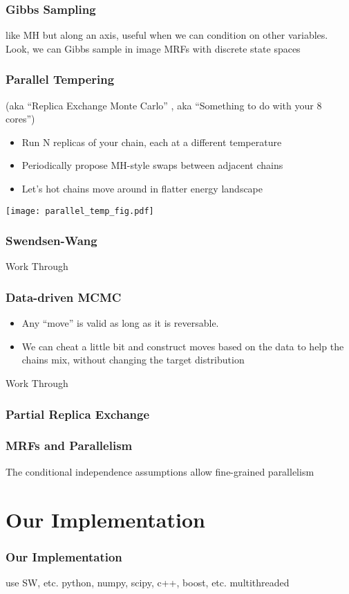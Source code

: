 \documentclass{beamer}
\begin{document}
\begin{frame}
  \frametitle{Gibbs Sampling}
  like MH but along an axis, useful when we can condition
  on other variables. 
  Look, we can Gibbs sample in image MRFs with discrete state spaces
  \cite{Geman_Stochastic_1990}
\end{frame}

\begin{frame}
  \frametitle{Parallel Tempering} 
  (aka ``Replica Exchange Monte Carlo'' \cite{Swendsen_Replica_1986}, aka ``Something to do with your 8 cores'')
  \begin{itemize}
  \item Run N replicas of your chain, each at a different temperature
  \item Periodically propose MH-style swaps between adjacent chains
  \item Let's hot chains move around in flatter energy landscape
  \end{itemize}
  \texttt{[image: parallel\_temp\_fig.pdf]}
\end{frame}

\begin{frame}
  \frametitle{Swendsen-Wang}
  Work Through
\end{frame}

\begin{frame}
  \frametitle{Data-driven MCMC}
  \begin{itemize}
    \item Any ``move'' is valid as long as it is reversable.  
    \item We can cheat a little bit and construct moves based on the data to help the chains mix, 
      without changing the target distribution
  \end{itemize}
  
  \cite{Tu_Image_2002}
  Work Through
\end{frame}

\begin{frame}
  \frametitle{Partial Replica Exchange}
  \cite{Liang_Evolutionary_2000}
\end{frame}

\begin{frame}
  \frametitle{MRFs and Parallelism}
  The conditional independence assumptions allow fine-grained parallelism
  
\end{frame}

\section{Our Implementation}
\begin{frame}
  \frametitle{Our Implementation}
  use SW, etc. 
  python, numpy, scipy, c++, boost, etc. 
  multithreaded
\end{frame}
\end{document}
